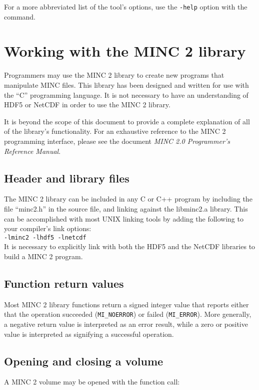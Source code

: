 \documentclass{article}
\begin{document}
For a more abbreviated list of the tool's options, use the {\tt -help} 
option with the command.

\newpage
\section{Working with the MINC 2 library}
Programmers may use the MINC 2 library to create new programs that manipulate
MINC files.  This library has been designed and written for use with the ``C''
programming language.  It is not necessary to have an understanding of HDF5
or NetCDF in order to use the MINC 2 library.

It is beyond the scope of this document to provide a complete
explanation of all of the library's functionality.  For an exhaustive
reference to the MINC 2 programming interface, please see the document
\emph{MINC 2.0 Programmer's Reference Manual}.

\subsection{Header and library files}
The MINC 2 library can be included in any C or C++ program by including
the file ``minc2.h'' in the source file, and linking against the libminc2.a
library.  This can be accomplished with most UNIX linking tools by adding
the following to your compiler's link options:\\

{\tt -lminc2 -lhdf5 -lnetcdf} \\

It is necessary to explicitly link with both the HDF5 and the NetCDF
libraries to build a MINC 2 program.

\subsection{Function return values}
Most MINC 2 library functions return a signed integer value that
reports either that the operation succeeded ({\tt MI\_NOERROR}) or
failed ({\tt MI\_ERROR}).  More generally, a negative return value
is interpreted as an error result, while a zero or positive value
is interpreted as signifying a successful operation.
\subsection{Opening and closing a volume}
A MINC 2 volume may be opened with the function call: \\
\end{document}
